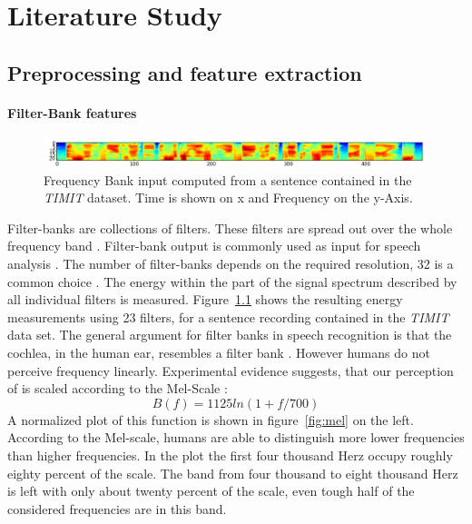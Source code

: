 \chapter{Literature Study}
\label{cha:intro}

\section{Preprocessing and feature extraction}
\subsubsection{Filter-Bank features}
\begin{figure}
\centering
\includegraphics[width=1.0\linewidth]{../png/timitInput}
\caption{Frequency Bank input computed from a sentence contained in the \textit{TIMIT} dataset. Time is shown on x and Frequency on the y-Axis.}
\label{fig:timitInput}
\end{figure}
Filter-banks are collections of filters. These filters are spread out over the whole frequency band \cite[page 251]{Huang2001}. Filter-bank output is commonly used as input for speech analysis \cite{Huang2001}\cite{Chan2015}. The number of filter-banks depends on the required resolution, 32 is a common choice \cite{Juang1987}. The energy within the part of the signal spectrum described by all individual filters is measured. Figure~\ref{fig:timitInput} shows the resulting energy measurements using 23 filters, for a sentence recording contained in the \textit{TIMIT} data set. 
The general argument for filter banks in speech recognition is that the cochlea, in the human ear, resembles a filter bank \cite[page 30]{Huang2001}. However humans do not perceive frequency linearly. Experimental evidence suggests, that our perception of is scaled according to the Mel-Scale \cite[page 34]{Huang2001}:
\begin{equation}
B(f) = 1125 ln(1 + f / 700)
\end{equation}
A normalized plot of this function is shown in figure~\ref{fig:mel} on the left.
According to the Mel-scale, humans are able to distinguish more lower frequencies than higher frequencies. In the plot the first four thousand Herz occupy roughly eighty percent of the scale. The band from four thousand to eight thousand Herz is left with only about twenty percent of the scale, even tough half of the considered frequencies are in this band. 
